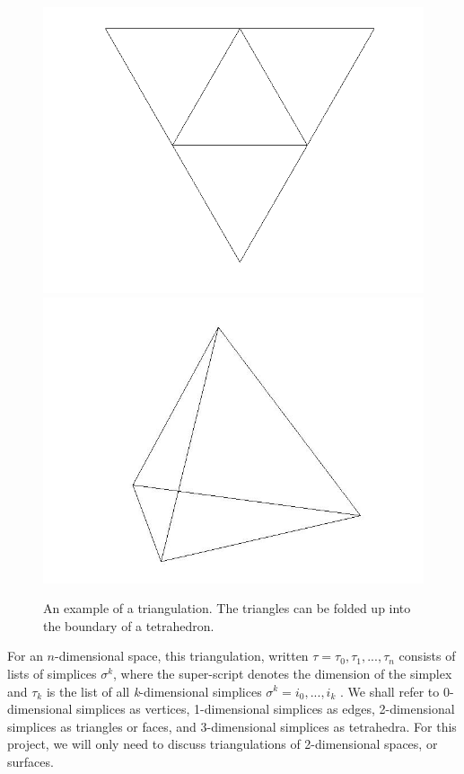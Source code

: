 \documentclass[12pt]{article}
\begin{document}
\begin{figure}
\includegraphics[scale = 0.5]{Pictures/flattetrahedron.png}
\includegraphics[scale = 0.3]{Pictures/tetrahedron.jpg}
\caption{An example of a triangulation. The triangles can be folded up into the boundary of a tetrahedron.}
\end{figure}

\noindent For an $n$-dimensional space, this triangulation, written $\tau = {\tau_0, \tau_1, ... , \tau_n}$ consists of lists of simplices $\sigma^k$, where the super-script denotes the dimension of the simplex and $\tau_k$ is the list of all \textit{k}-dimensional simplices $\sigma^k = {i_0, ... , i_k}$ \cite{Dave}. We shall refer to 0-dimensional simplices as vertices, 1-dimensional simplices as edges, 2-dimensional simplices as triangles or faces, and 3-dimensional simplices as tetrahedra. For this project, we will only need to discuss triangulations of 2-dimensional spaces, or surfaces.\newline
\end{document}

